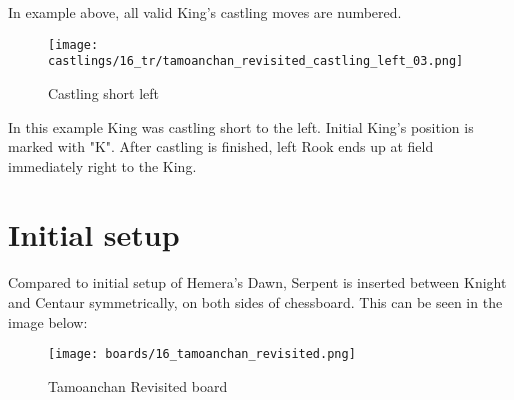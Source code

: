 In example above, all valid King's castling moves are numbered.

\noindent
\begin{figure}[!h]
\texttt{[image: castlings/16\_tr/tamoanchan\_revisited\_castling\_left\_03.png]}
\caption{Castling short left}
\label{fig:tamoanchan_revisited_castling_left_03}
\end{figure}

In this example King was castling short to the left. Initial King's position is marked with "K".
After castling is finished, left Rook ends up at field immediately right to the King.

\clearpage %

\section*{Initial setup}

Compared to initial setup of Hemera's Dawn, Serpent is inserted between Knight and Centaur
symmetrically, on both sides of chessboard. This can be seen in the image below:

\noindent
\begin{figure}[h]
\texttt{[image: boards/16\_tamoanchan\_revisited.png]}
\caption{Tamoanchan Revisited board}
\label{fig:16_tamoanchan_revisited}
\end{figure}

\clearpage %
